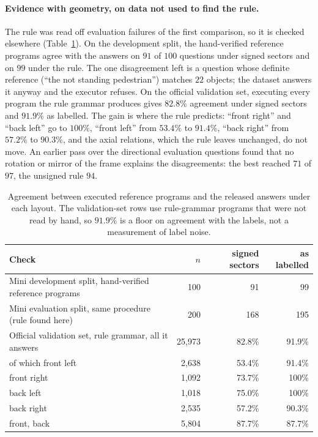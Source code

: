 \documentclass[11pt,a4paper]{article}
\begin{document}
\paragraph{Evidence with geometry, on data not used to find the rule.} The
rule was read off evaluation failures of the first comparison, so it is
checked elsewhere (Table~\ref{tab:geom}). On the development split, the
hand-verified reference programs agree with the answers on $91$ of $100$
questions under signed sectors and on $99$ under the rule. The one
disagreement left is a question whose definite reference (``the not standing
pedestrian'') matches $22$ objects; the dataset answers it anyway and the
executor refuses. On the official validation set, executing every program the
rule grammar produces gives $82.8\%$ agreement under signed sectors and
$91.9\%$ as labelled. The gain is where the rule predicts: ``front right''
and ``back left'' go to $100\%$, ``front left'' from $53.4\%$ to $91.4\%$,
``back right'' from $57.2\%$ to $90.3\%$, and the axial relations, which the
rule leaves unchanged, do not move. An earlier pass over the directional
evaluation questions found that no rotation or mirror of the frame explains
the disagreements: the best reached $71$ of $97$, the unsigned rule $94$.

\begin{table}[ht]
\centering
\small
\begin{tabular}{lrrr}
\toprule
Check & $n$ & signed sectors & as labelled \\
\midrule
Mini development split, hand-verified reference programs & 100 & 91 & 99 \\
Mini evaluation split, same procedure (rule found here)  & 200 & 168 & 195 \\
\midrule
Official validation set, rule grammar, all it answers    & 25,973 & 82.8\% & 91.9\% \\
\quad of which front left                                & 2,638  & 53.4\% & 91.4\% \\
\quad front right                                        & 1,092  & 73.7\% & 100\% \\
\quad back left                                          & 1,018  & 75.0\% & 100\% \\
\quad back right                                         & 2,535  & 57.2\% & 90.3\% \\
\quad front, back                                        & 5,804  & 87.7\% & 87.7\% \\
\bottomrule
\end{tabular}
\caption{Agreement between executed reference programs and the released
answers under each layout. The validation-set rows use rule-grammar programs
that were not read by hand, so $91.9\%$ is a floor on agreement with the
labels, not a measurement of label noise.}
\label{tab:geom}
\end{table}
\end{document}
